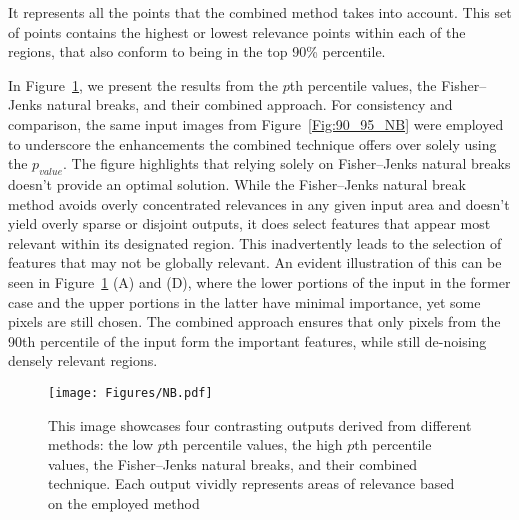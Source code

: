 It represents all the points that the combined method takes into account. This set of points contains the highest or lowest relevance points within each of the regions, that also conform to being in the top 90\% percentile.

In Figure~\ref{Fig:NB}, we present the results from the $p$th percentile values, the Fisher--Jenks natural breaks, and their combined approach. For consistency and comparison, the same input images from Figure~\ref{Fig:90_95_NB} were employed to underscore the enhancements the combined technique offers over solely using the $p_{value}$. The figure highlights that relying solely on Fisher--Jenks natural breaks doesn't provide an optimal solution. While the Fisher--Jenks natural break method avoids overly concentrated relevances in any given input area and doesn't yield overly sparse or disjoint outputs, it does select features that appear most relevant within its designated region. This inadvertently leads to the selection of features that may not be globally relevant. An evident illustration of this can be seen in Figure~\ref{Fig:NB} (A) and (D), where the lower portions of the input in the former case and the upper portions in the latter have minimal importance, yet some pixels are still chosen. The combined approach ensures that only pixels from the 90th percentile of the input form the important features, while still de-noising densely relevant regions.

\begin{figure}[ht!]
	\begin{center}
		\texttt{[image: Figures/NB.pdf]}
	\end{center}
	\caption{This image showcases four contrasting outputs derived from different methods: the low $p$th percentile values, the high $p$th percentile values, the Fisher--Jenks natural breaks, and their combined technique. Each output vividly represents areas of relevance based on the employed method}
	\label{Fig:NB}
\end{figure} 
